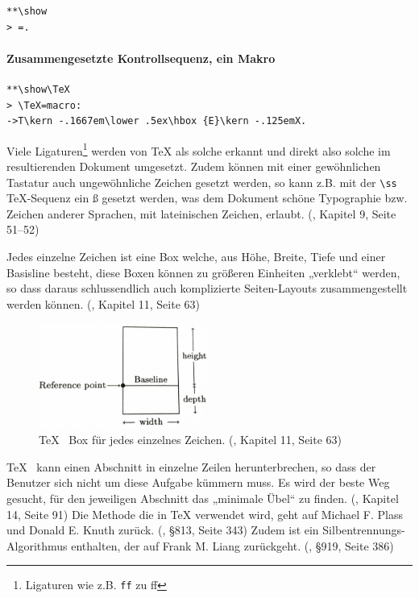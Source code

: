 \begin{verbatim}
**\show
> =.
\end{verbatim}

\paragraph{Zusammengesetzte Kontrollsequenz, ein Makro}

\begin{verbatim}
**\show\TeX
> \TeX=macro:
->T\kern -.1667em\lower .5ex\hbox {E}\kern -.125emX.
\end{verbatim}

Viele Ligaturen\footnote{Ligaturen wie z.B. \lstinline|ff| zu ff}
werden von TeX als solche erkannt und direkt also solche
im resultierenden Dokument umgesetzt. Zudem können mit einer gewöhnlichen
Tastatur auch ungewöhnliche Zeichen gesetzt werden, so kann z.B. mit der
\lstinline|\ss| \TeX-Sequenz ein ß gesetzt werden, was dem Dokument
schöne Typographie bzw. Zeichen anderer Sprachen, mit lateinischen
Zeichen, erlaubt. (\cite{tex-a}, Kapitel 9, Seite 51--52)

Jedes einzelne Zeichen ist eine Box welche, aus Höhe, Breite, Tiefe und
einer Basisline besteht, diese Boxen können
zu größeren Einheiten „verklebt“ werden, so dass daraus schlussendlich
auch komplizierte Seiten-Layouts zusammengestellt werden können.
(\cite{tex-a}, Kapitel 11, Seite 63)

\begin{figure}[h!]
  \centering
    \includegraphics[width=0.5\textwidth]{figures/tex_box.png}
  \caption{\TeX~ Box für jedes einzelnes Zeichen.
           (\cite{tex-a}, Kapitel 11, Seite 63)}\label{fig-tex_box}
\end{figure}

\TeX~ kann einen Abschnitt in einzelne Zeilen herunterbrechen, so dass
der Benutzer sich nicht um diese Aufgabe kümmern muss. Es wird der beste
Weg gesucht, für den jeweiligen Abschnitt das „minimale Übel“ zu finden.
(\cite{tex-a}, Kapitel 14, Seite 91)
Die Methode die in TeX verwendet wird, geht auf Michael F. Plass
und Donald E. Knuth zurück. (\cite{tex-b}, §813, Seite 343)
Zudem ist ein Silbentrennungs-Algorithmus enthalten, der auf
Frank M. Liang zurückgeht. (\cite{tex-b}, §919, Seite 386)

